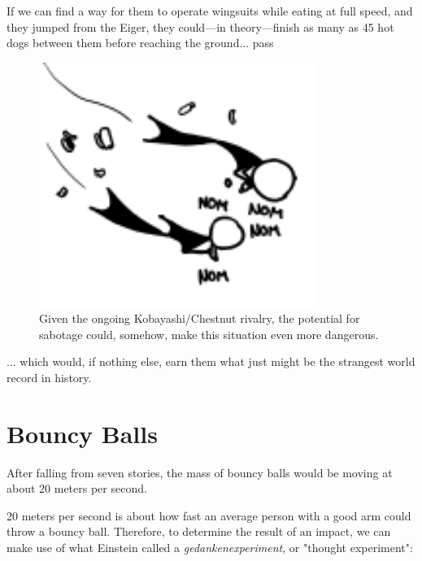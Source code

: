 {{If we can find a way for them to operate wingsuits while eating at full speed, and they jumped from the Eiger, they could—in theory—finish as many as 45 hot dogs between them before reaching the ground... pass}

\begin{figure}[!htbp]
\centering
\includegraphics[scale=0.5, max width=0.8\textwidth]{imgs/a/51/freefall_hotdogs.png}
\caption{Given the ongoing Kobayashi/Chestnut rivalry, the potential for sabotage could, somehow, make this situation even more dangerous.}
\end{figure}

{... which would, if nothing else, earn them what just might be the strangest world record in history.}

{
\chapter{Bouncy Balls}
}

\hfill{}

{After falling from seven stories, the mass of bouncy balls would be moving at about 20 meters per second.}

{20 meters per second is about how fast an average person with a good arm could throw a bouncy ball. Therefore, to determine the result of an impact, we can make use of what Einstein called a \emph{gedankenexperiment}, or "thought experiment":}

}
